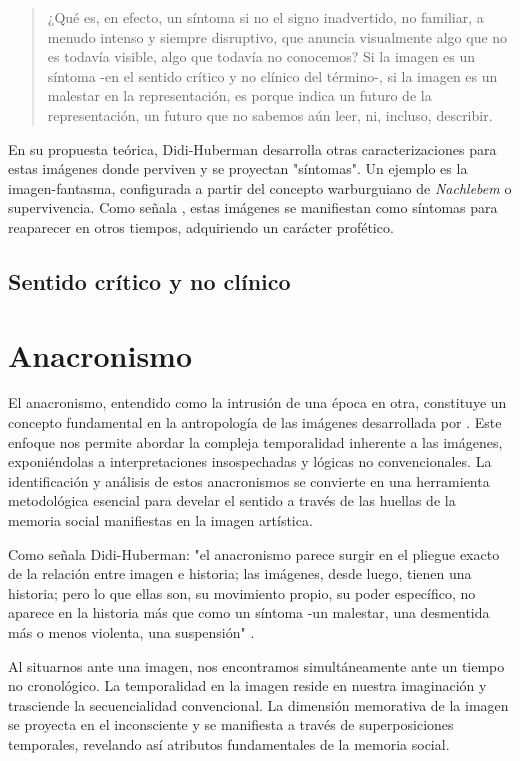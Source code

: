 \begin{quote}
¿Qué es, en efecto, un síntoma si no el signo inadvertido, no familiar, a menudo intenso y siempre disruptivo, que anuncia visualmente algo que no es todavía visible, algo que todavía no conocemos? Si la imagen es un síntoma -en el sentido crítico y no clínico del término-, si la imagen es un malestar en la representación, es porque indica un futuro de la representación, un futuro que no sabemos aún leer, ni, incluso, describir.
\end{quote}

En su propuesta teórica, Didi-Huberman desarrolla otras caracterizaciones para estas imágenes donde perviven y se proyectan "síntomas". Un ejemplo es la imagen-fantasma, configurada a partir del concepto warburguiano de \textit{Nachlebem} o supervivencia. Como señala \parencite{Dieguez2013}, estas imágenes se manifiestan como síntomas para reaparecer en otros tiempos, adquiriendo un carácter profético.

\subsection*{Sentido crítico y no clínico}

\section{Anacronismo}

El anacronismo, entendido como la intrusión de una época en otra, constituye un concepto fundamental en la antropología de las imágenes desarrollada por \parencite{DidiHuberman2011}. Este enfoque nos permite abordar la compleja temporalidad inherente a las imágenes, exponiéndolas a interpretaciones insospechadas y lógicas no convencionales. La identificación y análisis de estos anacronismos se convierte en una herramienta metodológica esencial para develar el sentido a través de las huellas de la memoria social manifiestas en la imagen artística.

Como señala Didi-Huberman: "el anacronismo parece surgir en el pliegue exacto de la relación entre imagen e historia; las imágenes, desde luego, tienen una historia; pero lo que ellas son, su movimiento propio, su poder específico, no aparece en la historia más que como un síntoma -un malestar, una desmentida más o menos violenta, una suspensión" \parencite[p. 48]{DidiHuberman2011}.

Al situarnos ante una imagen, nos encontramos simultáneamente ante un tiempo no cronológico. La temporalidad en la imagen reside en nuestra imaginación y trasciende la secuencialidad convencional. La dimensión memorativa de la imagen se proyecta en el inconsciente y se manifiesta a través de superposiciones temporales, revelando así atributos fundamentales de la memoria social.

